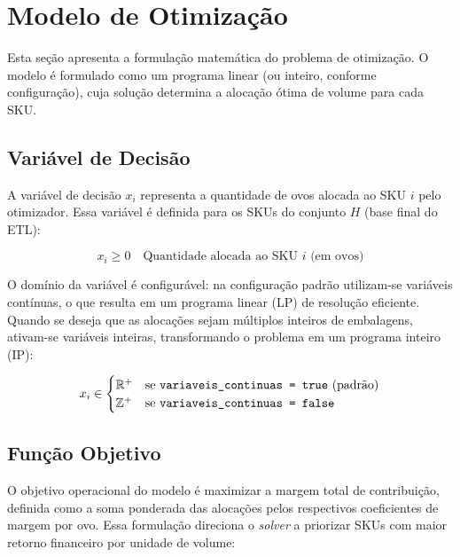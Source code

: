 \documentclass[11pt,a4paper]{article}
\begin{document}
\section{Modelo de Otimização}

Esta seção apresenta a formulação matemática do problema de otimização. O modelo
é formulado como um programa linear (ou inteiro, conforme configuração), cuja
solução determina a alocação ótima de volume para cada SKU.

\subsection{Variável de Decisão}

A variável de decisão $x_i$ representa a quantidade de ovos alocada ao SKU $i$
pelo otimizador. Essa variável é definida para os SKUs do conjunto $H$
(base final do ETL):

\begin{equation}\label{eq:auto:021}
x_i \geq 0 \quad \text{Quantidade alocada ao SKU } i \text{ (em ovos)}
\end{equation}

O domínio da variável é configurável: na configuração padrão utilizam-se
variáveis contínuas, o que resulta em um programa linear (LP) de resolução
eficiente. Quando se deseja que as alocações sejam múltiplos inteiros de
embalagens, ativam-se variáveis inteiras, transformando o problema em um
programa inteiro (IP):

\begin{equation}\label{eq:auto:022}
x_i \in \begin{cases}
\mathbb{R}^+ & \text{se \texttt{variaveis\_continuas = true} (padrão)} \\
\mathbb{Z}^+ & \text{se \texttt{variaveis\_continuas = false}}
\end{cases}
\end{equation}

\subsection{Função Objetivo}

O objetivo operacional do modelo é maximizar a margem total de contribuição, definida como
a soma ponderada das alocações pelos respectivos coeficientes de margem por ovo.
Essa formulação direciona o \textit{solver} a priorizar SKUs com maior retorno
financeiro por unidade de volume:
\end{document}
